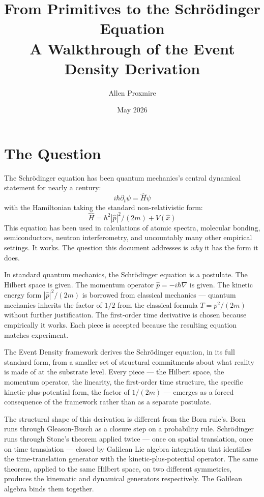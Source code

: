 \documentclass[11pt,a4paper]{article}
\title{\vspace{-1cm}\Large\bfseries From Primitives to the Schr\"odinger Equation\\[6pt]
\large\mdseries A Walkthrough of the Event Density Derivation}
\author{Allen Proxmire}
\date{May 2026}
\begin{document}
\maketitle

\section{The Question}

The Schr\"odinger equation has been quantum mechanics's central dynamical statement for nearly a century:
\[
i\hbar \partial_t \psi = \hat{H} \psi
\]
with the Hamiltonian taking the standard non-relativistic form:
\[
\hat{H} = \hbar^{2}|\hat{p}|^{2} / (2m) + V(\hat{x})
\]
This equation has been used in calculations of atomic spectra, molecular bonding, semiconductors, neutron interferometry, and uncountably many other empirical settings. It works. The question this document addresses is \emph{why} it has the form it does.

In standard quantum mechanics, the Schr\"odinger equation is a postulate. The Hilbert space is given. The momentum operator $\hat{p} = -i\hbar\nabla$ is given. The kinetic energy form $|\hat{p}|^{2}/(2m)$ is borrowed from classical mechanics --- quantum mechanics inherits the factor of $1/2$ from the classical formula $T = p^{2}/(2m)$ without further justification. The first-order time derivative is chosen because empirically it works. Each piece is accepted because the resulting equation matches experiment.

The Event Density framework derives the Schr\"odinger equation, in its full standard form, from a smaller set of structural commitments about what reality is made of at the substrate level. Every piece --- the Hilbert space, the momentum operator, the linearity, the first-order time structure, the specific kinetic-plus-potential form, the factor of $1/(2m)$ --- emerges as a forced consequence of the framework rather than as a separate postulate.

The structural shape of this derivation is different from the Born rule's. Born runs through Gleason-Busch as a closure step on a probability rule. Schr\"odinger runs through Stone's theorem applied twice --- once on spatial translation, once on time translation --- closed by Galilean Lie algebra integration that identifies the time-translation generator with the kinetic-plus-potential operator. The same theorem, applied to the same Hilbert space, on two different symmetries, produces the kinematic and dynamical generators respectively. The Galilean algebra binds them together.
\end{document}
